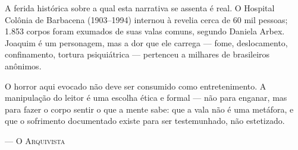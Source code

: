 \vspace{1.2em}

\vspace{1.2em}
\noindent A ferida histórica sobre a qual esta narrativa se assenta é real. O Hospital Colônia de Barbacena (1903--1994) internou à revelia cerca de 60 mil pessoas; 1.853 corpos foram exumados de suas valas comuns, segundo Daniela Arbex. Joaquim é um personagem, mas a dor que ele carrega --- fome, deslocamento, confinamento, tortura psiquiátrica --- pertenceu a milhares de brasileiros anônimos.

\vspace{0.6em}
\noindent O horror aqui evocado não deve ser consumido como entretenimento. A manipulação do leitor é uma escolha ética e formal --- não para enganar, mas para fazer o corpo sentir o que a mente sabe: que a vala não é uma metáfora, e que o sofrimento documentado existe para ser testemunhado, não estetizado.

\vspace{0.6em}

\vspace{1.4em}
\hfill{\scshape --- O Arquivista}\hspace{1em}

\endgroup
\clearpage
